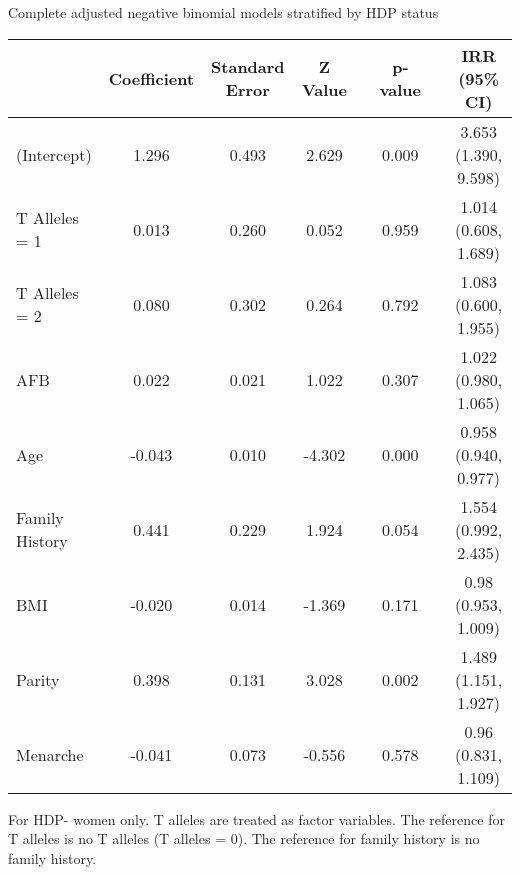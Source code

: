 \documentclass{standalone}
\begin{document}
\begin{threeparttable}
\caption{Complete adjusted negative binomial models stratified by HDP status}
\begin{tabular}{@{}lccccccc@{}}
  \toprule
 & Coefficient & Standard Error & Z Value & \hspace{1em} & p-value & \hspace{1em} & IRR (95\% CI) \\ 
  \midrule
(Intercept) & 1.296 & 0.493 & 2.629 && 0.009 && 3.653 (1.390, 9.598) \\ 
  T Alleles = 1\phantom{hdpxx} & 0.013 & 0.260 & 0.052 && 0.959 && 1.014 (0.608, 1.689) \\ 
  T Alleles = 2 & 0.080 & 0.302 & 0.264 && 0.792 && 1.083 (0.600, 1.955) \\ 
  AFB & 0.022 & 0.021 & 1.022 && 0.307 && 1.022 (0.980, 1.065) \\ 
  Age & -0.043 & 0.010 & -4.302 && 0.000 && 0.958 (0.940, 0.977) \\ 
  Family History & 0.441 & 0.229 & 1.924 && 0.054 && 1.554 (0.992, 2.435) \\ 
  BMI & -0.020 & 0.014 & -1.369 && 0.171 && 0.98 (0.953, 1.009) \\ 
  Parity & 0.398 & 0.131 & 3.028 && 0.002 && 1.489 (1.151, 1.927) \\ 
  Menarche & -0.041 & 0.073 & -0.556 && 0.578 && 0.96 (0.831, 1.109) \\
   \bottomrule
\end{tabular}
\begin{tablenotes}
\small
\item For HDP- women only. T alleles are treated as factor variables. The reference for T alleles is no T alleles (T alleles = 0). The reference for family history is no family history.
\end{tablenotes}
\end{threeparttable}
\end{document}
